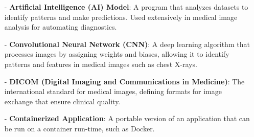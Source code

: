 \documentclass[12pt, titlepage]{article}
\begin{document}
\begin{itemize}
    
    
    \item[-] \textbf{Artificial Intelligence (AI) Model}: A program that analyzes datasets to identify patterns and make predictions. Used extensively in medical image analysis for automating diagnostics. 
    
    \item[-] \textbf{Convolutional Neural Network (CNN)}: A deep learning algorithm that processes images by assigning weights and biases, allowing it to identify patterns and features in medical images such as chest X-rays.
    
    \item[-] \textbf{DICOM (Digital Imaging and Communications in Medicine)}: The international standard for medical images, defining formats for image exchange that ensure clinical quality.
    
    \item[-] \textbf{Containerized Application}: A portable version of an application that can be run on a container run-time, such as Docker.
  

\end{itemize}
\end{document}
